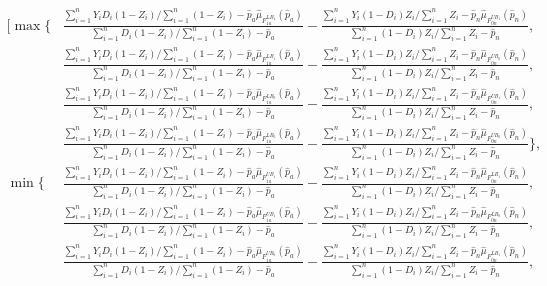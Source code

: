\documentclass[12pt]{article}
\theoremstyle{plain}
\theoremstyle{definition}
\theoremstyle{remark}
\begin{document}
\begin{equation*}
    \begin{aligned}
        \Bigg[ \max \Bigg\{& \frac{\sum_{i=1}^{n}Y_i D_i (1-Z_i) / \sum_{i=1}^{n} (1-Z_i) - \hat{p}_a \hat{\mu}_{F_{1a}^{LB_1}}(\hat{p}_a)}{\sum_{i=1}^{n} D_i (1-Z_i) / \sum_{i=1}^{n} (1-Z_i)-\hat{p}_a}-\frac{\sum_{i=1}^{n} Y_i (1-D_i) Z_i / \sum_{i=1}^{n}Z_i-\hat{p}_n \hat{\mu}_{F_{0n}^{UB_1}}\left(\hat{p}_n\right)}{\sum_{i=1}^{n} (1-D_i) Z_i/ \sum_{i=1}^{n} Z_i - \hat{p}_n}, \\
         & \frac{\sum_{i=1}^{n}Y_i D_i (1-Z_i) / \sum_{i=1}^{n} (1-Z_i) - \hat{p}_a \hat{\mu}_{F_{1a}^{LB_1}}(\hat{p}_a)}{\sum_{i=1}^{n} D_i (1-Z_i) / \sum_{i=1}^{n} (1-Z_i)-\hat{p}_a}-\frac{\sum_{i=1}^{n} Y_i (1-D_i) Z_i / \sum_{i=1}^{n}Z_i-\hat{p}_n \hat{\mu}_{F_{0n}^{UB_0}}\left(\hat{p}_n\right)}{\sum_{i=1}^{n} (1-D_i) Z_i/ \sum_{i=1}^{n} Z_i - \hat{p}_n}, \\ 
         & \frac{\sum_{i=1}^{n}Y_i D_i (1-Z_i) / \sum_{i=1}^{n} (1-Z_i) - \hat{p}_a \hat{\mu}_{F_{1a}^{LB_0}}(\hat{p}_a)}{\sum_{i=1}^{n} D_i (1-Z_i) / \sum_{i=1}^{n} (1-Z_i)-\hat{p}_a}-\frac{\sum_{i=1}^{n} Y_i (1-D_i) Z_i / \sum_{i=1}^{n}Z_i-\hat{p}_n \hat{\mu}_{F_{0n}^{UB_1}}\left(\hat{p}_n\right)}{\sum_{i=1}^{n} (1-D_i) Z_i/ \sum_{i=1}^{n} Z_i - \hat{p}_n}, \\ 
         & \frac{\sum_{i=1}^{n}Y_i D_i (1-Z_i) / \sum_{i=1}^{n} (1-Z_i) - \hat{p}_a \hat{\mu}_{F_{1a}^{LB_0}}(\hat{p}_a)}{\sum_{i=1}^{n} D_i (1-Z_i) / \sum_{i=1}^{n} (1-Z_i)-\hat{p}_a}-\frac{\sum_{i=1}^{n} Y_i (1-D_i) Z_i / \sum_{i=1}^{n}Z_i-\hat{p}_n \hat{\mu}_{F_{0n}^{UB_0}}\left(\hat{p}_n\right)}{\sum_{i=1}^{n} (1-D_i) Z_i/ \sum_{i=1}^{n} Z_i - \hat{p}_n} \Bigg\}, \\
         \min \Bigg\{& \frac{\sum_{i=1}^{n}Y_i D_i (1-Z_i) / \sum_{i=1}^{n} (1-Z_i) - \hat{p}_a \hat{\mu}_{F_{1a}^{UB_1}}(\hat{p}_a)}{\sum_{i=1}^{n} D_i (1-Z_i) / \sum_{i=1}^{n} (1-Z_i)-\hat{p}_a}-\frac{\sum_{i=1}^{n} Y_i (1-D_i) Z_i / \sum_{i=1}^{n}Z_i-\hat{p}_n \hat{\mu}_{F_{0n}^{LB_1}}\left(\hat{p}_n\right)}{\sum_{i=1}^{n} (1-D_i) Z_i/ \sum_{i=1}^{n} Z_i - \hat{p}_n}, \\
         & \frac{\sum_{i=1}^{n}Y_i D_i (1-Z_i) / \sum_{i=1}^{n} (1-Z_i) - \hat{p}_a \hat{\mu}_{F_{1a}^{UB_1}}(\hat{p}_a)}{\sum_{i=1}^{n} D_i (1-Z_i) / \sum_{i=1}^{n} (1-Z_i)-\hat{p}_a}-\frac{\sum_{i=1}^{n} Y_i (1-D_i) Z_i / \sum_{i=1}^{n}Z_i-\hat{p}_n \hat{\mu}_{F_{0n}^{LB_0}}\left(\hat{p}_n\right)}{\sum_{i=1}^{n} (1-D_i) Z_i/ \sum_{i=1}^{n} Z_i - \hat{p}_n}, \\ 
         & \frac{\sum_{i=1}^{n}Y_i D_i (1-Z_i) / \sum_{i=1}^{n} (1-Z_i) - \hat{p}_a \hat{\mu}_{F_{1a}^{UB_0}}(\hat{p}_a)}{\sum_{i=1}^{n} D_i (1-Z_i) / \sum_{i=1}^{n} (1-Z_i)-\hat{p}_a}-\frac{\sum_{i=1}^{n} Y_i (1-D_i) Z_i / \sum_{i=1}^{n}Z_i-\hat{p}_n \hat{\mu}_{F_{0n}^{LB_1}}\left(\hat{p}_n\right)}{\sum_{i=1}^{n} (1-D_i) Z_i/ \sum_{i=1}^{n} Z_i - \hat{p}_n}, \\ 

\end{aligned}
\end{equation*}
\end{document}
